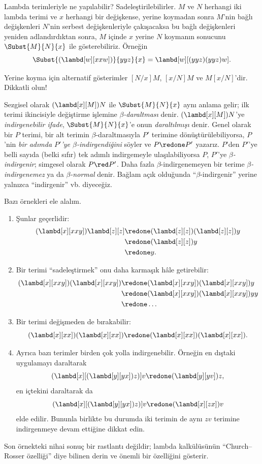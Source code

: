 


Lambda terimleriyle ne yapılabilir? Sadeleştirilebilirler. $M$ ve $N$
herhangi iki lambda terimi ve $x$ herhangi bir değişkense, yerine koymadan
sonra $M$'nin bağlı değişkenleri $N$'nin serbest değişkenleriyle çakışacaksa
bu bağlı değişkenleri yeniden adlandırdıktan sonra, $M$ içinde $x$ yerine
$N$ koymanın sonucunu $\Subst{M}{N}{x}$ ile gösterebiliriz. Örneğin
\[
\Subst{(\lambd[w][xxw])}{yyz}{x} = \lambd[w][(yyz)(yyz)w].
\]

\begin{digress}
Yerine koyma için alternatif gösterimler $[N/x]M$, $[x/N]M$ ve
$M[x/N]$'dir. Dikkatli olun!
\end{digress}

Sezgisel olarak $(\lambd[x][M])N$ ile $\Subst{M}{N}{x}$ aynı anlama gelir;
ilk terimi ikincisiyle değiştirme işlemine \emph{$\beta$-daraltması} denir.
$(\lambd[x][M])N$'ye \emph{indirgenebilir ifade},
$\Subst{M}{N}{x}$'e onun \emph{daraltılmışı} denir. Genel olarak bir $P$
terimi, bir alt terimin $\beta$-daraltmasıyla $P'$ terimine
dönüştürülebiliyorsa, $P$'nin \emph{bir adımda $P'$'ye $\beta$-indirgendiğini}
söyler ve $P\redone P'$ yazarız. $P$'den $P'$'ye belli sayıda (belki sıfır)
tek adımlı indirgemeyle ulaşılabiliyorsa $P$, $P'$'ye
\emph{$\beta$-indirgenir}; simgesel olarak $P\red P'$. Daha fazla
$\beta$-indirgenemeyen bir terime \emph{$\beta$-indirgenemez} ya da
\emph{$\beta$-normal} denir. Bağlam açık olduğunda ``$\beta$-indirgenir''
yerine yalnızca ``indirgenir'' vb. diyeceğiz.

Bazı örnekleri ele alalım.
\begin{enumerate}
\item Şunlar geçerlidir:
\begin{align*}
(\lambd[x][xxy]) \lambd[z][z] & \redone (\lambd[z][z])(\lambd[z][z]) y \\
& \redone (\lambd[z][z]) y \\
& \redone y.
\end{align*}
\item Bir terimi ``sadeleştirmek'' onu daha karmaşık hâle getirebilir:
\begin{align*}
(\lambd[x][xxy])(\lambd[x][xxy]) & \redone (\lambd[x][xxy])(\lambd[x][xxy])y \\
& \redone (\lambd[x][xxy])(\lambd[x][xxy])yy \\
& \redone \dots
\end{align*}
\item Bir terimi değişmeden de bırakabilir:
\[
(\lambd[x][xx])(\lambd[x][xx]) \redone (\lambd[x][xx])(\lambd[x][xx]).
\]
\item Ayrıca bazı terimler birden çok yolla indirgenebilir. Örneğin en dıştaki
  uygulamayı daraltarak
\[
(\lambd[x][(\lambd[y][yx]) z)] v \redone (\lambd[y][yv]) z,
\]
en içtekini daraltarak da
\[
(\lambd[x][(\lambd[y][yx]) z)] v \redone (\lambd[x][zx]) v
\]
elde edilir. Bununla birlikte bu durumda iki terimin de aynı $zv$ terimine
indirgenmeye devam ettiğine dikkat edin.
\end{enumerate}

Son örnekteki nihai sonuç bir rastlantı değildir; lambda kalkülüsünün
``Church--Rosser özelliği'' diye bilinen derin ve önemli bir özelliğini
gösterir.

